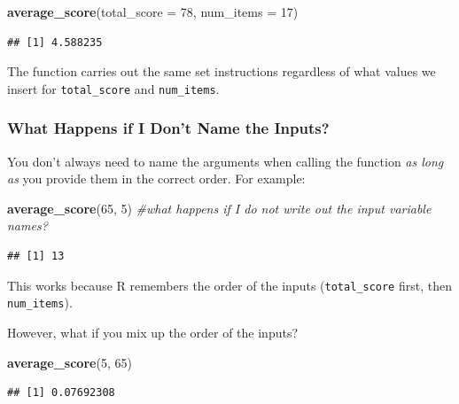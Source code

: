\documentclass[
]{book}
\newenvironment{Shaded}{\begin{snugshade}}{\end{snugshade}}
\newcommand{\AttributeTok}[1]{\textcolor[rgb]{0.13,0.29,0.53}{#1}}
\newcommand{\CommentTok}[1]{\textcolor[rgb]{0.56,0.35,0.01}{\textit{#1}}}
\newcommand{\DecValTok}[1]{\textcolor[rgb]{0.00,0.00,0.81}{#1}}
\newcommand{\FunctionTok}[1]{\textcolor[rgb]{0.13,0.29,0.53}{\textbf{#1}}}
\newcommand{\NormalTok}[1]{#1}
\begin{document}
\begin{Shaded}
\begin{Highlighting}[]
\FunctionTok{average\_score}\NormalTok{(}\AttributeTok{total\_score =} \DecValTok{78}\NormalTok{, }\AttributeTok{num\_items =} \DecValTok{17}\NormalTok{)}
\end{Highlighting}
\end{Shaded}

\begin{verbatim}
## [1] 4.588235
\end{verbatim}

The function carries out the same set instructions regardless of what values we insert for \texttt{total\_score} and \texttt{num\_items}.

\subsubsection{What Happens if I Don't Name the Inputs?}\label{what-happens-if-i-dont-name-the-inputs}

You don't always need to name the arguments when calling the function \emph{as long as} you provide them in the correct order. For example:

\begin{Shaded}
\begin{Highlighting}[]
\FunctionTok{average\_score}\NormalTok{(}\DecValTok{65}\NormalTok{, }\DecValTok{5}\NormalTok{) }\CommentTok{\#what happens if I do not write out the input variable names?}
\end{Highlighting}
\end{Shaded}

\begin{verbatim}
## [1] 13
\end{verbatim}

This works because R remembers the order of the inputs (\texttt{total\_score} first, then \texttt{num\_items}).

However, what if you mix up the order of the inputs?

\begin{Shaded}
\begin{Highlighting}[]
\FunctionTok{average\_score}\NormalTok{(}\DecValTok{5}\NormalTok{, }\DecValTok{65}\NormalTok{)}
\end{Highlighting}
\end{Shaded}

\begin{verbatim}
## [1] 0.07692308
\end{verbatim}
\end{document}
